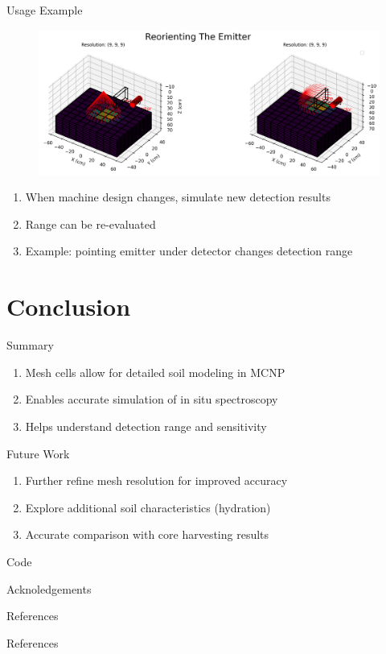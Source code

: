 \documentclass[10pt,hyperref={colorlinks,citecolor=blue,urlcolor=peking_blue,linkcolor=}]{beamer}
\theoremstyle{plain}
\begin{document}
\begin{frame}{Usage Example}
\begin{figure}[Detector Direction to Measured Density]
\begin{center}
\includegraphics[width=1\linewidth]{../Figures/MCNP/DetectorDirectiontoMeasuredDensity.png}
\end{center}
\end{figure}
\begin{enumerate}
\item When machine design changes, simulate new detection results
\item Range can be re-evaluated
\item Example: pointing emitter under detector changes detection range
\end{enumerate}
\end{frame}
\section{Conclusion}
\begin{frame}{Summary}
\begin{enumerate}
\item Mesh cells allow for detailed soil modeling in MCNP
\item Enables accurate simulation of in situ spectroscopy
\item Helps understand detection range and sensitivity
\end{enumerate}
\end{frame}
\begin{frame}{Future Work}
\begin{enumerate}
\item Further refine mesh resolution for improved accuracy
\item Explore additional soil characteristics (hydration)
\item Accurate comparison with core harvesting results
\end{enumerate}
\end{frame}
\begin{frame}{Code}
\end{frame}
\begin{frame}{Acknoledgements}
\end{frame}
\begin{frame}{References}
\end{frame}
\begin{frame}{References}%
    \renewcommand*{\bibfont}{\footnotesize}
    
    
\end{frame}
\end{document}
